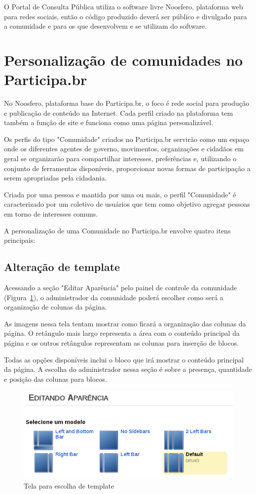 \documentclass[[a4paper,11pt]{article}
\begin{document}
O Portal de Consulta Pública utiliza o software livre Noosfero,
plataforma web para redes sociais, então o código produzido deverá ser público
e divulgado para a comunidade e para os que desenvolvem e se utilizam do
software.

\section{Personalização de comunidades no Participa.br}

No Noosfero, plataforma base do Participa.br, o foco é rede social para
produção e publicação de conteúdo na Internet. Cada perfil criado na plataforma
tem também a função de site e funciona como uma página personalizável.

Os perfis do tipo "Comunidade" criados no Participa.br servirão como um 
espaço onde os diferentes agentes de governo, movimentos, organizações e 
cidadãos em geral se organizarão para compartilhar interesses, preferências
e, utilizando o conjunto de ferramentas disponíveis, proporcionar novas 
formas de participação a serem apropriadas pela cidadania.

Criada por uma pessoa e mantida por uma ou mais, o perfil "Comunidade" é 
caracterizado por um coletivo de usuários que tem como objetivo agregar pessoas
em torno de interesses comuns. 

A personalização de uma Comunidade no Participa.br envolve quatro itens principais:

\subsection{Alteração de template}

Acessando a seção "Editar Aparência" pelo painel de controle da comunidade 
(Figura~\ref{fig:editar-template}), o administrador da comunidade poderá escolher
como será a organização de colunas da página.

As imagens nessa tela tentam mostrar como ficará a organização das colunas da
página. O retângulo mais largo representa a área com o conteúdo principal da
página e os outros retângulos representam as colunas para inserção de blocos.

Todas as opções disponíveis inclui o bloco que irá mostrar o conteúdo principal
da página. A escolha do administrador nessa seção é sobre a presença, quantidade
e posição das colunas para blocos.

\begin{figure}[h]
\center
\includegraphics[scale=0.5]{editar-template.png}
\caption{Tela para escolha de template}
\label{fig:editar-template}
\end{figure}
\end{document}
